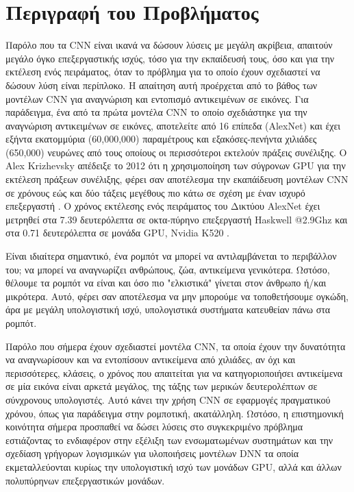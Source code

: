 \section{Περιγραφή του Προβλήματος}
\label{section:problem_description}

Παρόλο που τα CΝΝ είναι ικανά να δώσουν λύσεις με μεγάλη ακρίβεια, απαιτούν
μεγάλο όγκο επεξεργαστικής ισχύς, τόσο για την εκπαίδευσή τους, όσο και για την
εκτέλεση ενός πειράματος, όταν το πρόβλημα για το οποίο έχουν
σχεδιαστεί να δώσουν λύση είναι περίπλοκο. Η απαίτηση αυτή προέρχεται από το βάθος
των μοντέλων CNN για αναγνώριση και εντοπισμό αντικειμένων σε εικόνες.
Για παράδειγμα, ένα από τα πρώτα μοντέλα CNN το οποίο σχεδιάστηκε για την
αναγνώριση αντικειμένων σε εικόνες, αποτελείτε από 16 επίπεδα (AlexNet)
και έχει εξήντα εκατομμύρια (60,000,000) παραμέτρους και
εξακόσες-πενήντα χιλιάδες (650,000) νευρώνες από τους οποίους οι περισσότεροι
εκτελούν πράξεις συνέλιξης. Ο Alex Krizhevsky απέδειξε το 2012 ότι η χρησιμοποίηση
των σύγρονων GPU για την εκτέλεση πράξεων συνέλιξης, φέρει σαν αποτέλεσμα την
εκαπάίδευση μοντέλων CNN σε χρόνους εώς και δύο τάξεις μεγέθους πιο κάτω σε σχέση
με έναν ισχυρό επεξεργαστή \cite{NIPS2012_4824}. Ο χρόνος εκτέλεσης ενός πειράματος του Δικτύου AlexNet
έχει μετρηθεί στα 7.39 δευτερόλεπτα σε οκτα-πύρηνο επεξεργαστή Haskwell @2.9Ghz
και στα 0.71 δευτερόλεπτα σε μονάδα GPU, Nvidia K520 \cite{abuzaidoptimizing}.

Είναι ιδιαίτερα σημαντικό, ένα ρομπότ να μπορεί να αντιλαμβάνεται το περιβάλλον
του; να μπορεί να αναγνωρίζει ανθρώπους, ζώα, αντικείμενα γενικότερα. Ωστόσο,
θέλουμε τα ρομπότ να είναι και όσο πιο "ελκιστικά" γίνεται στον άνθρωπο ή/και μικρότερα.
Αυτό, φέρει σαν αποτέλεσμα να μην μπορούμε να τοποθετήσουμε ογκώδη, άρα με μεγάλη
υπολογιστική ισχύ, υπολογιστικά συστήματα κατευθείαν πάνω στα ρομπότ.

Παρόλο που σήμερα έχουν σχεδιαστεί μοντέλα CNN, τα οποία έχουν την δυνατότητα να
αναγνωρίσουν και να εντοπίσουν αντικείμενα από χιλιάδες, αν όχι και περισσότερες,
κλάσεις, ο χρόνος που απαιτείται για να κατηγοριοποιήσει αντικείμενα σε μία εικόνα
είναι αρκετά μεγάλος, της τάξης των μερικών δευτερολέπτων σε σύνχρονους υπολογιστές.
Αυτό κάνει την χρήση CNN σε εφαρμογές πραγματικού χρόνου, όπως για παράδειγμα
στην ρομποτική, ακατάλληλη.
Ωστόσο, η επιστημονική κοινότητα σήμερα προσπαθεί να δώσει λύσεις στο συγκεκριμένο
πρόβλημα εστιάζοντας το ενδιαφέρον στην εξέλιξη των ενσωματωμένων συστημάτων
και την σχεδίαση γρήγορων λογισμικών για υλοποιήσεις μοντέλων DNN τα οποία
εκμεταλλεύονται κυρίως την υπολογιστική ισχύ των μονάδων GPU, αλλά και άλλων
πολυπύρηνων επεξεργαστικών μονάδων.
